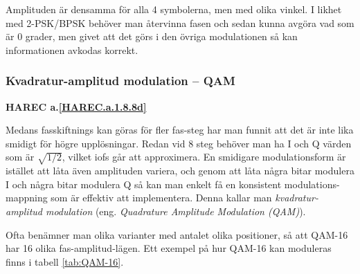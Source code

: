 Amplituden är densamma för alla 4 symbolerna, men med olika vinkel.
I likhet med 2-PSK/BPSK behöver man återvinna fasen och sedan kunna avgöra
vad som är 0 grader, men givet att det görs i den övriga modulationen så
kan informationen avkodas korrekt.

\subsubsection{Kvadratur-amplitud modulation -- QAM}
\textbf{HAREC a.\ref{HAREC.a.1.8.8d}\label{myHAREC.a.1.8.8d}}
\label{QAM}

Medans fasskiftnings kan göras för fler fas-steg har man funnit att det är
inte lika smidigt för högre upplösningar. Redan vid 8 steg behöver man ha
I och Q värden som är \(\sqrt{1/2}\), vilket iofs går att approximera.
En smidigare modulationsform är istället att låta även amplituden variera,
och genom att låta några bitar modulera I och några bitar modulera Q så kan
man enkelt få en konsistent modulations-mappning som är effektiv att
implementera. Denna kallar man \emph{kvadratur-amplitud modulation} (eng.
\emph{Quadrature Amplitude Modulation (QAM)}).

Ofta benämner man olika varianter med antalet olika positioner, så att QAM-16
har 16 olika fas-amplitud-lägen.
Ett exempel på hur QAM-16 kan moduleras finns i tabell \ref{tab:QAM-16}.

